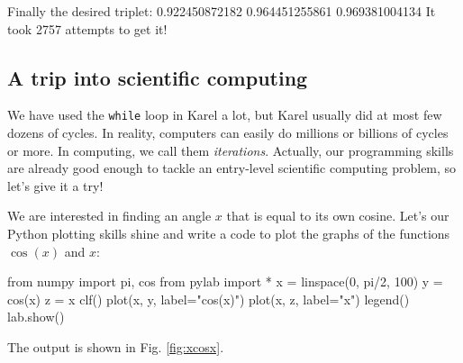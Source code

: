 \begin{bluecode}
Finally the desired triplet:
0.922450872182 0.964451255861 0.969381004134
It took 2757 attempts to get it!
\end{bluecode}

\subsection{A trip into scientific computing}

We have used the {\tt while} loop in Karel a lot,
but Karel usually did at most few dozens of cycles. In reality, computers can easily 
do millions or billions of cycles or more. In computing, we call them {\em iterations}.
Actually, our programming skills are already good enough to tackle an entry-level
scientific computing problem, so let's give it a try! 

We are interested in finding an angle $x$ that is equal
to its own cosine. Let's our Python plotting skills shine 
and write a code to plot the graphs of
the functions $\cos(x)$ and $x$:

\begin{bluecode}
from numpy import pi, cos
from pylab import *
x = linspace(0, pi/2, 100)
y = cos(x)
z = x
clf()
plot(x, y, label="cos(x)")
plot(x, z, label="x")
legend()
lab.show()
\end{bluecode}
The output is shown in Fig. \ref{fig:xcosx}.

